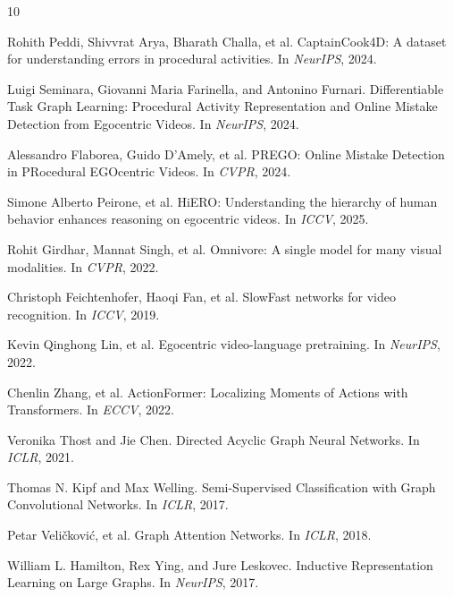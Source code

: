 \documentclass[10pt,twocolumn,letterpaper]{article}
\begin{document}
{\small
\begin{thebibliography}{10}

Rohith Peddi, Shivvrat Arya, Bharath Challa, et al.
\newblock CaptainCook4D: A dataset for understanding errors in procedural activities.
\newblock In \emph{NeurIPS}, 2024.

Luigi Seminara, Giovanni Maria Farinella, and Antonino Furnari.
\newblock Differentiable Task Graph Learning: Procedural Activity Representation and Online Mistake Detection from Egocentric Videos.
\newblock In \emph{NeurIPS}, 2024.

Alessandro Flaborea, Guido D'Amely, et al.
\newblock PREGO: Online Mistake Detection in PRocedural EGOcentric Videos.
\newblock In \emph{CVPR}, 2024.

Simone Alberto Peirone, et al.
\newblock HiERO: Understanding the hierarchy of human behavior enhances reasoning on egocentric videos.
\newblock In \emph{ICCV}, 2025.

Rohit Girdhar, Mannat Singh, et al.
\newblock Omnivore: A single model for many visual modalities.
\newblock In \emph{CVPR}, 2022.

Christoph Feichtenhofer, Haoqi Fan, et al.
\newblock SlowFast networks for video recognition.
\newblock In \emph{ICCV}, 2019.

Kevin Qinghong Lin, et al.
\newblock Egocentric video-language pretraining.
\newblock In \emph{NeurIPS}, 2022.

Chenlin Zhang, et al.
\newblock ActionFormer: Localizing Moments of Actions with Transformers.
\newblock In \emph{ECCV}, 2022.

Veronika Thost and Jie Chen.
\newblock Directed Acyclic Graph Neural Networks.
\newblock In \emph{ICLR}, 2021.

Thomas N. Kipf and Max Welling.
\newblock Semi-Supervised Classification with Graph Convolutional Networks.
\newblock In \emph{ICLR}, 2017.

Petar Veli{\v{c}}kovi{\'c}, et al.
\newblock Graph Attention Networks.
\newblock In \emph{ICLR}, 2018.

William L. Hamilton, Rex Ying, and Jure Leskovec.
\newblock Inductive Representation Learning on Large Graphs.
\newblock In \emph{NeurIPS}, 2017.

\end{thebibliography}
}
\end{document}
